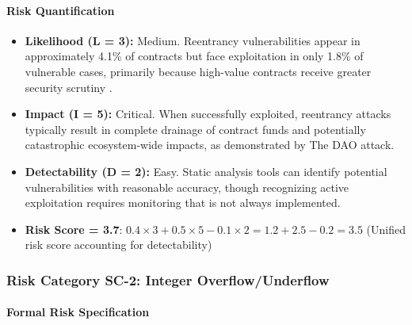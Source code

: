 \paragraph{Risk Quantification}

\begin{itemize}
\item \textbf{Likelihood (L = 3):} Medium. Reentrancy vulnerabilities appear in approximately 4.1\% of contracts but face exploitation in only 1.8\% of vulnerable cases, primarily because high-value contracts receive greater security scrutiny \cite{perez2021analysis}.

\item \textbf{Impact (I = 5):} Critical. When successfully exploited, reentrancy attacks typically result in complete drainage of contract funds and potentially catastrophic ecosystem-wide impacts, as demonstrated by The DAO attack.

\item \textbf{Detectability (D = 2):} Easy. Static analysis tools can identify potential vulnerabilities with reasonable accuracy, though recognizing active exploitation requires monitoring that is not always implemented.

\item \textbf{Risk Score = 3.7}: $0.4 \times 3 + 0.5 \times 5 - 0.1 \times 2 = 1.2 + 2.5 - 0.2 = 3.5$ (Unified risk score accounting for detectability)
\end{itemize}

\subsubsection{Risk Category SC-2: Integer Overflow/Underflow}

\paragraph{Formal Risk Specification}

